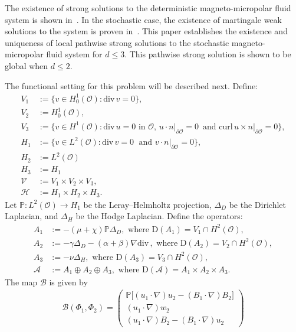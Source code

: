 \documentclass[11pt, reqno]{amsart}
\theoremstyle{definition}
\numberwithin{equation}{section}
\newcommand{\bb}{\mathbb}
\newcommand{\divg}{\mathrm{div}\,}
\begin{document}
The existence of strong solutions to the deterministic magneto-micropolar fluid system is shown in~\cite{Roj97, Yam05}. In the stochastic case, the existence of martingale weak solutions to the system is proven in~\cite{Yam14, Yam16m}. This paper establishes the existence and uniqueness of local pathwise strong solutions to the stochastic magneto-micropolar fluid system for $d\leq 3$. This pathwise strong solution is shown to be global when $d\leq 2$.

The functional setting for this problem will be described next. Define:
\begin{align*}
    V_1 &:= \{v\in H^1_0(\mathscr{O}): \divg v=0\},
    \\
    V_2 &:= H^1_0(\mathscr{O}),
    \\
    V_3 &:= \{v\in H^1(\mathscr{O}): \divg u=0 \text{ in $\mathscr{O}$, } \left. u\cdot n \right|_{\partial \mathscr{O}}= 0 \,\text{ and } \left.\mathrm{curl}\, u\times n\right|_{\partial\mathscr{O}}=0\},
    \\
    H_1 &:= \{v\in L^2(\mathscr{O}): \divg v=0 \;\text{ and } \left. v\cdot n \right|_{\partial \mathscr{O}}= 0\},
    \\
    H_2 &:= L^2(\mathscr{O})
    \\
    H_3 &:= H_1
    \\
    \mathcal{V} &:= V_1 \times V_2 \times V_3,
    \\
    \mathcal{H} &:= H_1 \times H_2 \times H_3.
\end{align*}
Let $\bb{P}:L^2(\mathscr{O})\to H_1$ be the Leray--Helmholtz projection, $\Delta_D$ be the Dirichlet Laplacian, and $\Delta_H$ be the Hodge Laplacian. Define the operators:
\begin{align*}
    A_1 &:= -(\mu+\chi)\bb{P}\Delta_D, \text{ where } 
    \mathrm{D}(A_1)= V_1 \cap H^2(\mathscr{O}),
    \\
    A_2 &:= -\gamma\Delta_D  -(\alpha+\beta)\nabla \divg,\text{ where } \mathrm{D}(A_2)= V_2 \cap H^2(\mathscr{O}),
    \\
    A_3 &:= -\nu \Delta_H, \text{ where } \mathrm{D}(A_3)= V_3 \cap H^2(\mathscr{O}),
    \\
    \mathcal{A} &:= A_1\oplus A_2 \oplus A_3, \text{ where } \mathrm{D}(\mathcal{A})= A_1\times A_2\times A_3.
\end{align*}
The map $\mathcal{B}$ is given by
\begin{align*}
    \mathcal{B}(\Phi_1,\Phi_2)= 
    \begin{pmatrix} \bb{P}\big[(u_1\cdot\nabla)u_2- (B_1\cdot\nabla)B_2 \big] \\[0.5ex] (u_1\cdot\nabla) w_2
    \\[0.5ex]
    (u_1\cdot\nabla)B_2- (B_1\cdot\nabla) u_2 \end{pmatrix}
\end{align*}
\end{document}
